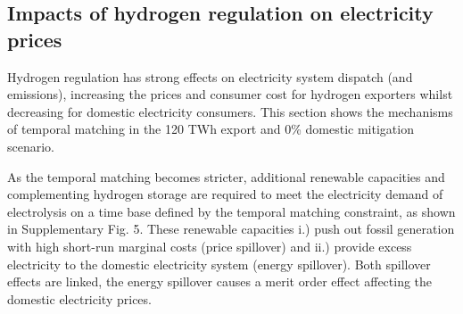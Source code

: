 




\subsection*{Impacts of hydrogen regulation on electricity prices}
\label{subsec:benefits_rule}

Hydrogen regulation has strong effects on electricity system dispatch (and emissions), increasing the prices and consumer cost for hydrogen exporters whilst decreasing for domestic electricity consumers. This section shows the mechanisms of temporal matching in the 120 TWh export and 0\% domestic \co mitigation scenario.

As the temporal matching becomes stricter, additional renewable capacities and complementing hydrogen storage are required to meet the electricity demand of electrolysis
on a time base defined by the temporal matching constraint, as shown in Supplementary Fig. 5. %
These renewable capacities i.) push out fossil generation with high short-run marginal costs (price spillover) and ii.) provide excess electricity to the domestic electricity system (energy spillover). Both spillover effects are linked, the energy spillover causes a merit order effect affecting the domestic electricity prices.

